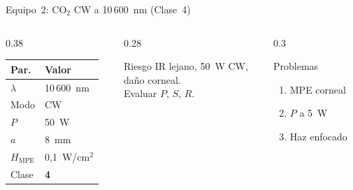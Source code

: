 \documentclass[aspectratio=169,12pt]{beamer}
\begin{document}
\begin{frame}{Equipo~2: CO$_2$ CW a 10\,600~nm (Clase~4)}
	\begin{columns}
		\begin{column}{0.38\textwidth}
			\centering\scriptsize
			\begin{tabular}{ll}
				\toprule
				\textbf{Par.}      & \textbf{Valor} \\
				\midrule
				$\lambda$          & 10\,600~nm     \\
				Modo               & CW             \\
				$P$                & 50~W           \\
				$a$                & 8~mm           \\
				$H_{\mathrm{MPE}}$ & 0,1~W/cm$^2$   \\
				\rowcolor{aerored!15}
				Clase              & \textbf{4}     \\
				\bottomrule
			\end{tabular}
		\end{column}
		\begin{column}{0.28\textwidth}
			\begin{alertblock}{\scriptsize Riesgo}
				\scriptsize
				IR lejano, 50~W CW,\\
				daño corneal.\\
				Evaluar $P$, $S$, $R$.
			\end{alertblock}
		\end{column}
		\begin{column}{0.3\textwidth}
			\begin{exampleblock}{\scriptsize Problemas}
				\scriptsize
				\begin{enumerate}
					\item[P2.1] MPE corneal
					\item[P2.2] $P$ a 5~W
					\item[P2.3] Haz enfocado
				\end{enumerate}
			\end{exampleblock}
		\end{column}
	\end{columns}
\end{frame}
\end{document}
